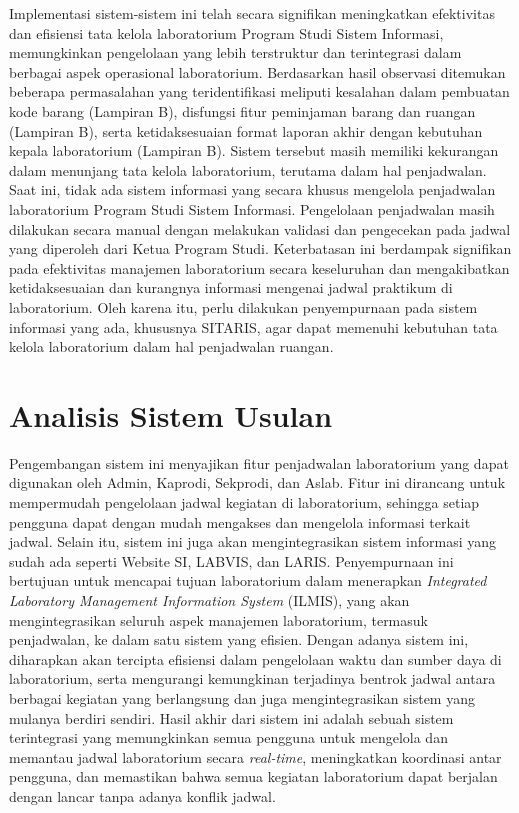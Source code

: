 Implementasi sistem-sistem ini telah secara signifikan meningkatkan efektivitas dan efisiensi tata kelola laboratorium Program Studi Sistem Informasi, memungkinkan pengelolaan yang lebih terstruktur dan terintegrasi dalam berbagai aspek operasional laboratorium. Berdasarkan hasil observasi ditemukan beberapa permasalahan yang teridentifikasi meliputi kesalahan dalam pembuatan kode barang (Lampiran B), disfungsi fitur peminjaman barang dan ruangan (Lampiran B), serta ketidaksesuaian format laporan akhir dengan kebutuhan kepala laboratorium (Lampiran B). Sistem tersebut masih memiliki kekurangan dalam menunjang tata kelola laboratorium, terutama dalam hal penjadwalan. Saat ini, tidak ada sistem informasi yang secara khusus mengelola penjadwalan laboratorium Program Studi Sistem Informasi. Pengelolaan penjadwalan masih dilakukan secara manual dengan melakukan validasi dan pengecekan pada jadwal yang diperoleh dari Ketua Program Studi. Keterbatasan ini berdampak signifikan pada efektivitas manajemen laboratorium secara keseluruhan dan mengakibatkan ketidaksesuaian dan kurangnya informasi mengenai jadwal praktikum di laboratorium. Oleh karena itu, perlu dilakukan penyempurnaan pada sistem informasi yang ada, khususnya SITARIS, agar dapat memenuhi kebutuhan tata kelola laboratorium dalam hal penjadwalan ruangan.

\section{Analisis Sistem Usulan}
Pengembangan sistem ini menyajikan fitur penjadwalan laboratorium yang dapat digunakan oleh Admin, Kaprodi, Sekprodi, dan Aslab. Fitur ini dirancang untuk mempermudah pengelolaan jadwal kegiatan di laboratorium, sehingga setiap pengguna dapat dengan mudah mengakses dan mengelola informasi terkait jadwal. Selain itu, sistem ini juga akan mengintegrasikan sistem informasi yang sudah ada seperti Website SI, LABVIS, dan LARIS. Penyempurnaan ini bertujuan untuk mencapai tujuan laboratorium dalam menerapkan \textit{Integrated Laboratory Management Information System} (ILMIS), yang akan mengintegrasikan seluruh aspek manajemen laboratorium, termasuk penjadwalan, ke dalam satu sistem yang efisien. Dengan adanya sistem ini, diharapkan akan tercipta efisiensi dalam pengelolaan waktu dan sumber daya di laboratorium, serta mengurangi kemungkinan terjadinya bentrok jadwal antara berbagai kegiatan yang berlangsung dan juga mengintegrasikan sistem yang mulanya berdiri sendiri. Hasil akhir dari sistem ini adalah sebuah sistem terintegrasi yang memungkinkan semua pengguna untuk mengelola dan memantau jadwal laboratorium secara \textit{real-time}, meningkatkan koordinasi antar pengguna, dan memastikan bahwa semua kegiatan laboratorium dapat berjalan dengan lancar tanpa adanya konflik jadwal.

